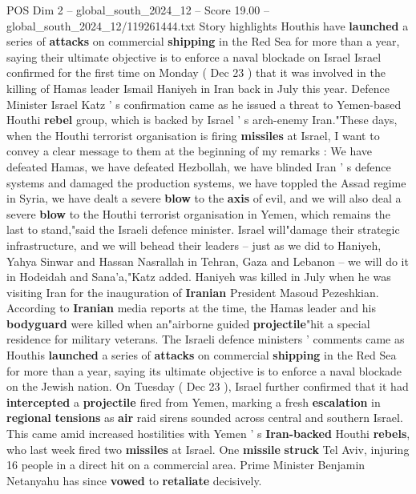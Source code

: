 \begin{textsample}{POS Dim 2 – global\_south\_2024\_12 – Score 19.00 – global\_south\_2024\_12/119261444.txt}  \label{ex:f2_pos_210}
Story highlights Houthis have \textbf{launched} a series of \textbf{attacks} on commercial \textbf{shipping} in the Red Sea for more than a year, saying their ultimate objective is to enforce a naval blockade on Israel Israel confirmed for the first time on Monday ( Dec 23 ) that it was involved in the killing of Hamas leader Ismail Haniyeh in Iran back in July this year.
Defence Minister Israel Katz ' s confirmation came as he issued a threat to Yemen-based Houthi \textbf{rebel} group, which is backed by Israel ' s arch-enemy Iran."These days, when the Houthi terrorist organisation is firing \textbf{missiles} at Israel, I want to convey a clear message to them at the beginning of my remarks : We have defeated Hamas, we have defeated Hezbollah, we have blinded Iran ' s defence systems and damaged the production systems, we have toppled the Assad regime in Syria, we have dealt a severe \textbf{blow} to the \textbf{axis} of evil, and we will also deal a severe \textbf{blow} to the Houthi terrorist organisation in Yemen, which remains the last to stand,"said the Israeli defence minister.
Israel will"damage their strategic infrastructure, and we will behead their leaders -- just as we did to Haniyeh, Yahya Sinwar and Hassan Nasrallah in Tehran, Gaza and Lebanon -- we will do it in Hodeidah and Sana'a,"Katz added.
Haniyeh was killed in July when he was visiting Iran for the inauguration of \textbf{Iranian} President Masoud Pezeshkian.
According to \textbf{Iranian} media reports at the time, the Hamas leader and his \textbf{bodyguard} were killed when an"airborne guided \textbf{projectile}"hit a special residence for military veterans.
The Israeli defence ministers ' comments came as Houthis \textbf{launched} a series of \textbf{attacks} on commercial \textbf{shipping} in the Red Sea for more than a year, saying its ultimate objective is to enforce a naval blockade on the Jewish nation.
On Tuesday ( Dec 23 ), Israel further confirmed that it had \textbf{intercepted} a \textbf{projectile} fired from Yemen, marking a fresh \textbf{escalation} in \textbf{regional} \textbf{tensions} as \textbf{air} raid sirens sounded across central and southern Israel.
This came amid increased hostilities with Yemen ' s \textbf{Iran-backed} Houthi \textbf{rebels}, who last week fired two \textbf{missiles} at Israel.
One \textbf{missile} \textbf{struck} Tel Aviv, injuring 16 people in a direct hit on a commercial area.
Prime Minister Benjamin Netanyahu has since \textbf{vowed} to \textbf{retaliate} decisively.

\end{textsample}
